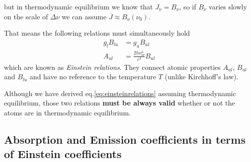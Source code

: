 but in thermodynamic equilibrium we know that $J_{\nu} = B_{\nu}$, so if $B_{\nu}$ varies slowly on the scale of $\Delta\nu$ we can assume $\overline{J}\approx B_{\nu}(\nu_{0})$.
\par That means the following relations must simultaneously hold
\begin{align}
    g_{l}B_{lu} &= g_{u}B_{ul} \\
    A_{ul} &= \frac{2h\nu^{3}_{ul}}{c^{2}}B_{ul}
    \label{eq:einsteinrelations}
\end{align}
which are known as \emph{Einstein relations}. They connect atomic properties $A_{ul}$, $B_{ul}$ and $B_{lu}$ and have no reference to the temperature $T$ (unlike Kirchhoff's law).
\par Although we have derived eq.\ref{eq:einsteinrelations} assuming thermodynamic equilibrium, those two relations \textbf{must be always valid} whether or not the atoms are in thermodynamic equilibrium.

\subsection{Absorption and Emission coefficients in terms of Einstein coefficients}

